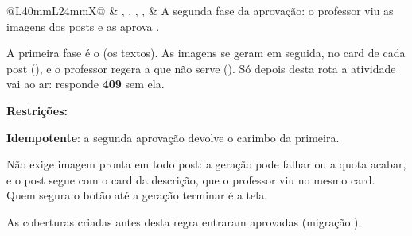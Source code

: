 \begin{tabularx}{\linewidth}{@{}L{40mm}L{24mm}X@{}}
\zebra {} & , , , ,  & A segunda fase da aprovação: o professor viu as imagens dos posts e as aprova .\par A primeira fase é o  (os textos). As imagens se geram em seguida, no card de cada post (), e o professor regera a que não serve (). Só depois desta rota a atividade vai ao ar:  responde \textbf{409}  sem ela.\par \textbf{Restrições:}\par \hspace*{1em}\textbullet{} \textbf{Idempotente}: a segunda aprovação devolve o carimbo da primeira.\par \hspace*{1em}\textbullet{} Não exige imagem pronta em todo post: a geração pode falhar ou a quota acabar, e o post segue com o card da descrição, que o professor viu no mesmo card. Quem segura o botão até a geração terminar é a tela.\par \hspace*{1em}\textbullet{} As coberturas criadas antes desta regra entraram aprovadas (migração ).\\

\end{tabularx}
